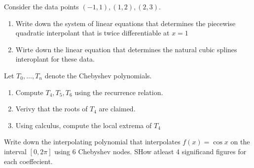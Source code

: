 \documentclass[5pt, a4paper]{article}
\begin{document}
\begin{tcolorbox}[title=Question 4]
    Consider the data points $(-1,1),(1,2),(2,3).$ 
    \begin{enumerate}[label=\alph*)]
        \item Write down the system of linear equations that determines the
            piecewise quadratic interpolant that is twice differentiable at $x =
            1$
        \item Wirte down the linear equation that determines the natural cubic
            splines interoplant for these data.
    \end{enumerate}
\end{tcolorbox}
\begin{tcolorbox}[title=Question 5]
    Let $T_0,\ldots,T_n$ denote the Chebyshev polynomials.
    \begin{enumerate}[label=\alph*)]
        \item Compute $T_4,T_5,T_6$ using the recurrence relation.
        \item Verivy that the roots of $T_4$ are claimed.
        \item Using calculus, compute the local extrema of $T_4$
    \end{enumerate}
\end{tcolorbox}
\begin{tcolorbox}[title=Question 6]
    Write down the interpolating polynomial that interpolates $f(x) = \cos x$ on
    the interval $[0,2\pi]$ using 6 Chebyshev nodes. SHow atleast 4 significand
    figures for each coeffecient. 
\end{tcolorbox}
\end{document}
